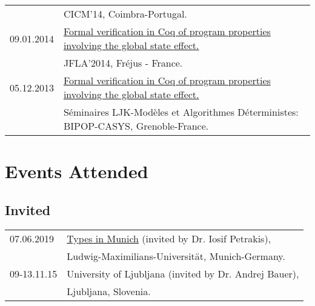 \documentclass[a4paper,9pt]{article} %
\begin{document}
\begin{longtable}{ll}
& CICM'14, Coimbra-Portugal.\\[0.25cm]
{\normalsize09.01.2014} & \href{http://jfla.inria.fr/2014/ekici.pdf}{ Formal verification in Coq of program properties involving the global state effect.} \\
& JFLA'2014, Fréjus - France.\\[0.25cm]
{\normalsize05.12.2013} & \href{http://ljk.imag.fr/membres/Burak.Ekici/BurakEkici_LJK-Seminar.pdf}{Formal verification in Coq of program properties involving the global state effect.}\\
& Séminaires LJK-Modèles et Algorithmes Déterministes: BIPOP-CASYS, Grenoble-France.
\end{longtable}


\section*{Events Attended}
{\vskip4mm}
\subsection*{Invited}

\begin{tabular}{ll}	
{\small 07.06.2019} & \href{http://cj-xu.github.io/tim19/index.html}{Types in Munich} (invited by Dr. Iosif Petrakis),\\
& Ludwig-Maximilians-Universität, Munich-Germany.\\[0.25cm]
{\small09-13.11.15} & University of Ljubljana (invited by Dr. Andrej Bauer), \\
& Ljubljana, Slovenia.
\end{tabular}
\end{document}
